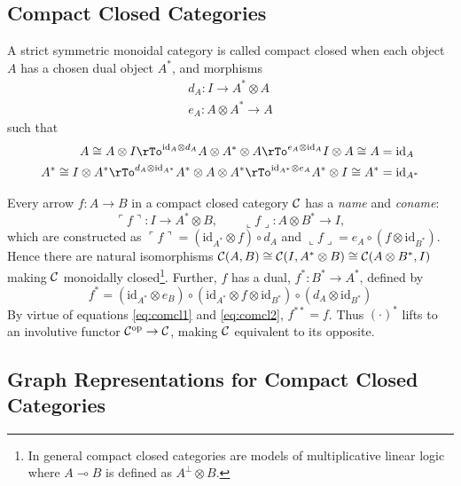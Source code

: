\documentclass[runningheads]{llncs}
\newcommand{\iso}{\cong}
\newcommand{\name}[1]{%
\ulcorner #1 \urcorner}
\newcommand{\coname}[1]{%
\llcorner #1 \lrcorner}
\newcommand{\catC}{\ensuremath{{\cal C}}\xspace}
\newcommand{\id}[1]{\ensuremath{\mathrm{id}_{#1}}}
\begin{document}
\subsection{Compact Closed Categories}
\label{sec:comp-clos-categ}

\begin{definition}
\label{compactcat-def}
A strict symmetric monoidal  category
\cite{MacLane:CatsWM:1971,AspLon:CatTypStruct:1991} is called compact 
closed \cite{KelLap:comcl:1980} when each object $A$ has a chosen dual
object $A^*$, and morphisms
\begin{gather*}
  d_A : I \to A^* \otimes A\\
  e_A : A \otimes A^* \to A
\end{gather*}
such that
\begin{align}
  A \iso A \otimes I \rTo^{\id{A} \otimes d_A} A \otimes A^* \otimes A
  \rTo^{e_A \otimes \id{A}} I \otimes A \iso A & = \id{A} \label{eq:comcl1}\\
  A^* \iso I \otimes A^* \rTo^{ d_A \otimes \id{A^*}} A^* \otimes A
  \otimes A^* \rTo^{\id{A^*} \otimes e_A} A^* \otimes I \iso A^* & =
  \id{A^*} \label{eq:comcl2}
\end{align}
\end{definition}

Every arrow $f:A\to B$ in a compact closed category \catC
has a \emph{name} and \emph{coname}:
\[
\name{f} : I \to A^* \otimes B, \qquad \coname{f} : A \otimes  B^* \to I,
\]
which are constructed as $\name{f} = (\id{A^*}\otimes f) \circ d_A$ and
$\coname{f} = e_A \circ (f \otimes \id{B^*})$.  Hence there are natural
isomorphisms $\catC(A,B) \iso \catC(I,A^*\otimes B) \iso
\catC(A\otimes B^*,I)$ making \catC monoidally closed\footnote{In
  general compact closed categories  are models of multiplicative
  linear logic where $A \multimap B$ is defined as $A^\bot \otimes B$.}.
Further,  $f$ has a dual, $f^* : B^* \to A^*$, defined by 
\[
f^* = (\id{A^*} \otimes e_B) \circ (\id{A^*}\otimes f \otimes
\id{B^*}) \circ (d_A \otimes \id{B^*})
\]
By virtue of equations \eqref{eq:comcl1} and \eqref{eq:comcl2}, $f^{**} =
f$.  Thus $(\cdot)^*$ lifts to an involutive functor
$\catC^{\text{op}} \to \catC$,  making $\catC$ equivalent to its
opposite.

\subsection{Graph Representations for Compact Closed Categories}
\label{sec:graph-repr-comp}
\end{document}
